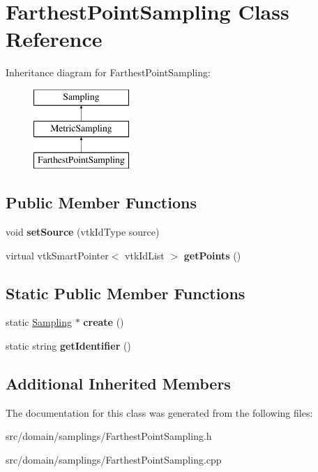 \hypertarget{class_farthest_point_sampling}{}\section{Farthest\+Point\+Sampling Class Reference}
\label{class_farthest_point_sampling}
Inheritance diagram for Farthest\+Point\+Sampling\+:\begin{figure}[H]
\begin{center}
\leavevmode
\includegraphics[height=3.000000cm]{class_farthest_point_sampling}
\end{center}
\end{figure}
\subsection*{Public Member Functions}
\begin{DoxyCompactItemize}
\item 
\hypertarget{class_farthest_point_sampling_a11fb39b69f5405fe47864bf867e5578e}{}void {\bfseries set\+Source} (vtk\+Id\+Type source)\label{class_farthest_point_sampling_a11fb39b69f5405fe47864bf867e5578e}

\item 
\hypertarget{class_farthest_point_sampling_a4c7c351804be31817a96aafeb578d99b}{}virtual vtk\+Smart\+Pointer$<$ vtk\+Id\+List $>$ {\bfseries get\+Points} ()\label{class_farthest_point_sampling_a4c7c351804be31817a96aafeb578d99b}

\end{DoxyCompactItemize}
\subsection*{Static Public Member Functions}
\begin{DoxyCompactItemize}
\item 
\hypertarget{class_farthest_point_sampling_a72bb32dad66e35e712cfaaaeec381fe2}{}static \hyperlink{class_sampling}{Sampling} $\ast$ {\bfseries create} ()\label{class_farthest_point_sampling_a72bb32dad66e35e712cfaaaeec381fe2}

\item 
\hypertarget{class_farthest_point_sampling_ae80cd0e1c311eb9f60603bf2ae24a0d4}{}static string {\bfseries get\+Identifier} ()\label{class_farthest_point_sampling_ae80cd0e1c311eb9f60603bf2ae24a0d4}

\end{DoxyCompactItemize}
\subsection*{Additional Inherited Members}


The documentation for this class was generated from the following files\+:\begin{DoxyCompactItemize}
\item 
src/domain/samplings/Farthest\+Point\+Sampling.\+h\item 
src/domain/samplings/Farthest\+Point\+Sampling.\+cpp\end{DoxyCompactItemize}
